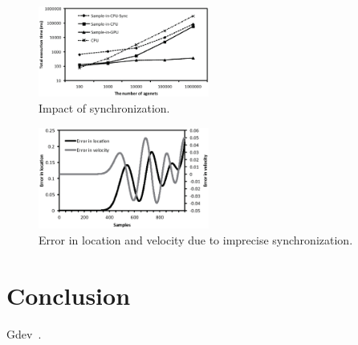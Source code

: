 \documentclass[times, 10pt, twocolumn]{article}
\begin{document}
\begin{figure}[t]
\centering
\includegraphics[width=0.5\textwidth]{eps/eval_nosync.eps}
\caption{Impact of synchronization.}
\label{fig:eval_nosync}
\end{figure}

\begin{figure}[t]
\centering
\includegraphics[width=0.5\textwidth]{eps/eval_error.eps}
\caption{Error in location and velocity due to imprecise synchronization.}
\label{fig:eval_error}
\end{figure}

\section{Conclusion}
\label{sec:conclusion}

Gdev~\cite{Kato2012}.


{\footnotesize

}
\end{document}

